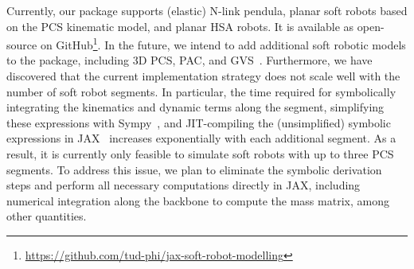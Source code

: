 Currently, our package supports (elastic) N-link pendula, planar soft robots based on the \gls{PCS} kinematic model, and planar \gls{HSA} robots. It is available as open-source on GitHub\footnote{\url{https://github.com/tud-phi/jax-soft-robot-modelling}}.
In the future, we intend to add additional soft robotic models to the package, including 3D \gls{PCS}\citep{renda2018discrete}, \gls{PAC}\citep{stella2023piecewise}, and \gls{GVS}~\citep{boyer2020dynamics}.
Furthermore, we have discovered that the current implementation strategy does not scale well with the number of soft robot segments. In particular, the time required for symbolically integrating the kinematics and dynamic terms along the segment, simplifying these expressions with Sympy~\citep{meurer2017sympy}, and JIT-compiling the (unsimplified) symbolic expressions in JAX~\citep{jax2018github} increases exponentially with each additional segment. As a result, it is currently only feasible to simulate soft robots with up to three \gls{PCS} segments. To address this issue, we plan to eliminate the symbolic derivation steps and perform all necessary computations directly in JAX, including numerical integration along the backbone to compute the mass matrix, among other quantities.


